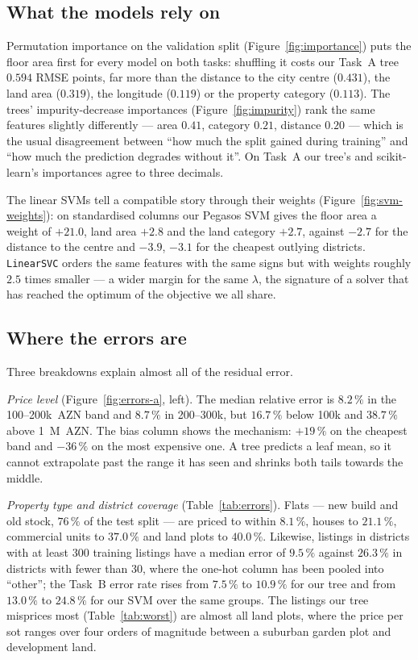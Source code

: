 \documentclass[10pt,twocolumn,a4paper]{article}
\begin{document}
\subsection{What the models rely on}
Permutation importance on the validation split (Figure~\ref{fig:importance})
puts the floor area first for every model on both tasks: shuffling it costs
our Task~A tree $0.594$ RMSE points, far more than the distance to the city
centre ($0.431$), the land area ($0.319$), the longitude ($0.119$) or the
property category ($0.113$). The trees' impurity-decrease importances
(Figure~\ref{fig:impurity}) rank the same features slightly differently ---
area $0.41$, category $0.21$, distance $0.20$ --- which is the usual
disagreement between ``how much the split gained during training'' and ``how
much the prediction degrades without it''. On Task~A our tree's and
scikit-learn's importances agree to three decimals.

The linear SVMs tell a compatible story through their weights
(Figure~\ref{fig:svm-weights}): on standardised columns our Pegasos SVM gives
the floor area a weight of $+21.0$, land area $+2.8$ and the land category
$+2.7$, against $-2.7$ for the distance to the centre and $-3.9$, $-3.1$ for
the cheapest outlying districts. \texttt{LinearSVC} orders the same features
with the same signs but with weights roughly $2.5$ times smaller --- a wider
margin for the same $\lambda$, the signature of a solver that has reached the
optimum of the objective we all share.

\subsection{Where the errors are}
Three breakdowns explain almost all of the residual error.

\emph{Price level} (Figure~\ref{fig:errors-a}, left). The median relative
error is $8.2\,\%$ in the 100--200k~AZN band and $8.7\,\%$ in 200--300k, but
$16.7\,\%$ below 100k and $38.7\,\%$ above 1~M~AZN. The bias column shows the
mechanism: $+19\,\%$ on the cheapest band and $-36\,\%$ on the most expensive
one. A tree predicts a leaf mean, so it cannot extrapolate past the range it
has seen and shrinks both tails towards the middle.

\emph{Property type and district coverage} (Table~\ref{tab:errors}). Flats ---
new build and old stock, $76\,\%$ of the test split --- are priced to within
$8.1\,\%$, houses to $21.1\,\%$, commercial units to $37.0\,\%$ and land plots
to $40.0\,\%$. Likewise, listings in districts with at least 300 training
listings have a median error of $9.5\,\%$ against $26.3\,\%$ in districts with
fewer than 30, where the one-hot column has been pooled into ``other''; the
Task~B error rate rises from $7.5\,\%$ to $10.9\,\%$ for our tree and from
$13.0\,\%$ to $24.8\,\%$ for our SVM over the same groups. The listings our
tree misprices most (Table~\ref{tab:worst}) are almost all land plots, where
the price per sot ranges over four orders of magnitude between a suburban
garden plot and development land.
\end{document}
